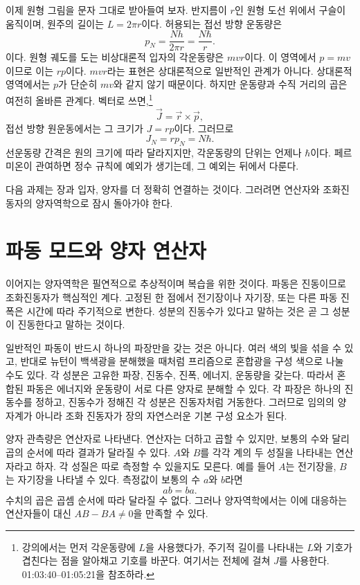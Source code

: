 이제 원형 그림을 문자 그대로 받아들여 보자. 반지름이 \(r\)인 원형 도선 위에서 구슬이 움직이며, 원주의 길이는 \(L=2\pi r\)이다. 허용되는 접선 방향 운동량은 \begin{equation}
p_N=\frac{Nh}{2\pi r}=\frac{N\hbar}{r}.
\end{equation}이다. 원형 궤도를 도는 비상대론적 입자의 각운동량은 \(mvr\)이다. 이 영역에서 \(p=mv\)이므로 이는 \(rp\)이다. \(mvr\)라는 표현은 상대론적으로 일반적인 관계가 아니다. 상대론적 영역에서는 \(p\)가 단순히 \(mv\)와 같지 않기 때문이다. 하지만 운동량과 수직 거리의 곱은 여전히 올바른 관계다. 벡터로 쓰면,\footnote{강의에서는 먼저 각운동량에 \(L\)을 사용했다가, 주기적 길이를 나타내는 \(L\)와 기호가 겹친다는 점을 알아채고 기호를 바꾼다. 여기서는 전체에 걸쳐 \(J\)를 사용한다. 01:03:40--01:05:21을 참조하라.}\begin{equation}
\vec J=\vec r\times\vec p,
\end{equation}접선 방향 원운동에서는 그 크기가 \(J=rp\)이다. 그러므로 \begin{equation}
J_N=rp_N=N\hbar.
\end{equation}선운동량 간격은 원의 크기에 따라 달라지지만, 각운동량의 단위는 언제나 \(\hbar\)이다. 페르미온이 관여하면 정수 규칙에 예외가 생기는데, 그 예외는 뒤에서 다룬다.

다음 과제는 장과 입자, 양자를 더 정확히 연결하는 것이다. 그러려면 연산자와 조화진동자의 양자역학으로 잠시 돌아가야 한다.

\section{파동 모드와 양자 연산자}

이어지는 양자역학은 필연적으로 추상적이며 복습을 위한 것이다. 파동은 진동이므로 조화진동자가 핵심적인 계다. 고정된 한 점에서 전기장이나 자기장, 또는 다른 파동 진폭은 시간에 따라 주기적으로 변한다. 성분의 진동수가 있다고 말하는 것은 곧 그 성분이 진동한다고 말하는 것이다.

일반적인 파동이 반드시 하나의 파장만을 갖는 것은 아니다. 여러 색의 빛을 섞을 수 있고, 반대로 뉴턴이 백색광을 분해했을 때처럼 프리즘으로 혼합광을 구성 색으로 나눌 수도 있다. 각 성분은 고유한 파장, 진동수, 진폭, 에너지, 운동량을 갖는다. 따라서 혼합된 파동은 에너지와 운동량이 서로 다른 양자로 분해할 수 있다. 각 파장은 하나의 진동수를 정하고, 진동수가 정해진 각 성분은 진동자처럼 거동한다. 그러므로 임의의 양자계가 아니라 조화 진동자가 장의 자연스러운 기본 구성 요소가 된다.

양자 관측량은 연산자로 나타낸다. 연산자는 더하고 곱할 수 있지만, 보통의 수와 달리 곱의 순서에 따라 결과가 달라질 수 있다. \(A\)와 \(B\)를 각각 계의 두 성질을 나타내는 연산자라고 하자. 각 성질은 따로 측정할 수 있을지도 모른다. 예를 들어 \(A\)는 전기장을, \(B\)는 자기장을 나타낼 수 있다. 측정값이 보통의 수 \(a\)와 \(b\)라면 \begin{equation}
ab=ba.
\end{equation} 수치의 곱은 곱셈 순서에 따라 달라질 수 없다. 그러나 양자역학에서는 이에 대응하는 연산자들이 대신 \(AB-BA\neq0\)을 만족할 수 있다.


